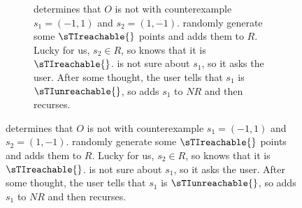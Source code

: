 \begin{figure*}[ht]
\begin{subfigure}[t]{0.58\textwidth}
    \caption{%
      \Helper{} determines that $O$ is not  with
      counterexample $s_1 = (-1, 1)$ and $s_2 = (1, -1)$. \Helper{} randomly
      generate some $\sTIreachable{}$ points and adds them to $R$. Lucky for
      us, $s_2 \in R$, so \Helper{} knows that it is $\sTIreachable{}$.
      \Helper{} is not sure about $s_1$, so it asks the user. After some
      thought, the user tells \Helper{} that $s_1$ is $\sTIunreachable{}$, so
      \Helper{} adds $s_1$ to $NR$ and then recurses.
    }
  \end{subfigure}


\end{figure*}
